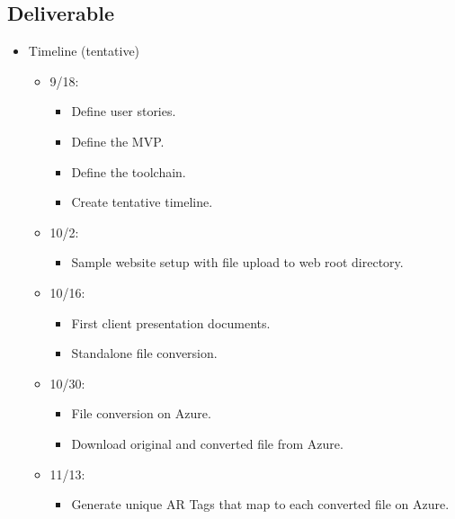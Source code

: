 \subsection{Deliverable}
    \begin{itemize} 
        \item Timeline (tentative) 
        \label{itm:Sprint0-Timeline}
        \begin{itemize}
            \item 9/18:
            \begin{itemize}
                \item Define user stories.
                \item Define the MVP.
                \item Define the toolchain.
                \item Create tentative timeline.
            \end{itemize}

            \item 10/2: 
            \begin{itemize}
                \item Sample website setup with file upload to web root directory.
            \end{itemize}

            \item 10/16: 
            \begin{itemize}
                \item First client presentation documents.
                \item Standalone file conversion.
            \end{itemize}

            \item 10/30:
            \begin{itemize}
                \item File conversion on Azure.
                \item Download original and converted file from Azure.
            \end{itemize}

            \item 11/13:
            \begin{itemize}
                \item Generate unique AR Tags that map to each converted file on Azure.
            \end{itemize}
            

\end{itemize}
\end{itemize}
